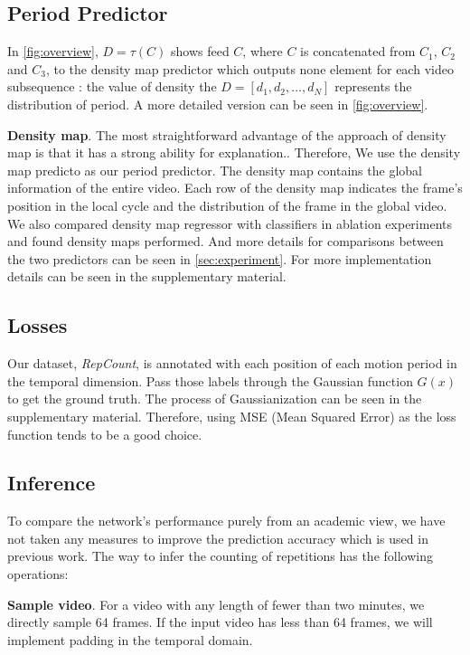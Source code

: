 \documentclass[10pt,twocolumn,letterpaper]{article}
\begin{document}
\subsection{Period Predictor}
In \cref{fig:overview}, $D=\tau(C) $ shows feed $C$, where $C$ is concatenated from $C_1$, $C_2$ and $C_3$, to the density map predictor which outputs none element for each video subsequence : the value of density  the $D = [d_1,d_2,\dots,d_N]$ represents the distribution of period. A more detailed version can be seen in \cref{fig:overview}.

\noindent \textbf{Density map}.
The most straightforward advantage of the approach of density map is that it has a strong ability for explanation.. Therefore, We use the density map predicto as our period predictor. The density map contains the global information of the entire video. Each row of the density map indicates the frame's position in the local cycle and the distribution of the frame in the global video. We also compared density map regressor with classifiers in ablation experiments and found density maps performed. And more details for comparisons between the two predictors can be seen in \cref{sec:experiment}. For more implementation details can be seen in the supplementary material.



 \subsection{Losses}  
 Our dataset, \emph{RepCount}, is annotated with each position of each motion period in the temporal dimension. Pass those labels through the Gaussian function $G(x)$ to get the ground truth. The process of Gaussianization can be seen in the supplementary material. Therefore, using MSE (Mean Squared Error) as the loss function tends to be a good choice.


\subsection{Inference}
To compare the network's performance purely from an academic view, we have not taken any measures to improve the prediction accuracy which is used in previous work\cite{RepNet}. The way to infer the counting of  repetitions has the following operations:

\noindent \textbf{Sample video}.
For a video with any length of fewer than two minutes, we directly sample 64 frames. If the input video has less than 64 frames, we will implement padding in the temporal domain.
       
\end{document}
